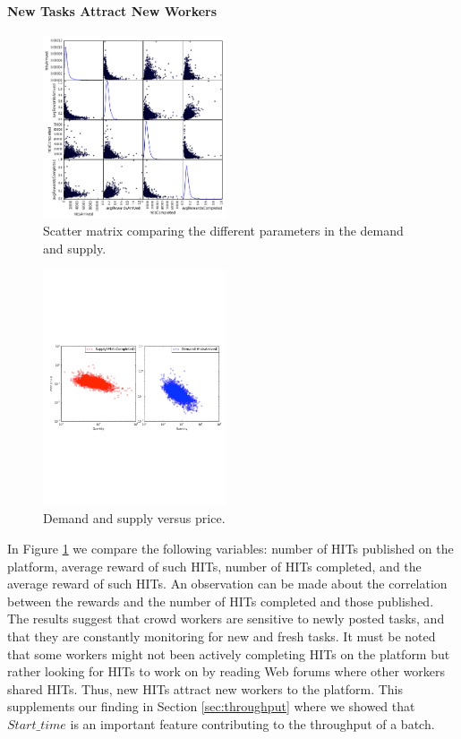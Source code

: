 \paragraph{New Tasks Attract New Workers}
\begin{figure}[tb]
	\centering
		\includegraphics[width=0.48\textwidth]{figures/scattermatrix}
	\caption{Scatter matrix comparing the different parameters in the demand and supply.}
	\label{fig:scatter_matrix}
\end{figure}
\begin{figure}[tb]
	\centering
		\includegraphics[width=0.48\textwidth]{figures/supply_demand}
	\caption{Demand and supply versus price.}
	\label{fig:dsup}
\end{figure}
In Figure \ref{fig:scatter_matrix} we compare  the following variables: number of HITs published on the platform, average reward of such HITs, number of HITs completed, and the average reward of such HITs. An observation  can be made about the correlation between the rewards and the number of HITs completed and those published.
The results suggest that crowd workers are sensitive to newly posted tasks, and that they are constantly monitoring for new and fresh tasks.
It must be noted that some workers might not been actively completing HITs on the platform but rather looking for HITs to work on by reading Web forums where other workers shared HITs. Thus, new HITs attract new workers to the platform.
This supplements our finding in Section \ref{sec:throughput} where we showed that $Start\_time$ is an important feature contributing to the throughput of a batch.

